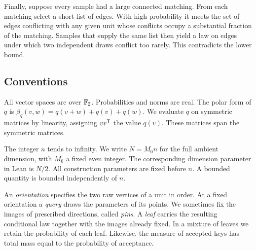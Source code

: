 Finally, suppose every sample had a large connected matching. From each
matching select a short list of edges. With high probability it meets the set of
edges conflicting with any given unit whose conflicts occupy a substantial
fraction of the matching. Samples that supply
the same list then yield a law on edges under which two independent
draws conflict too rarely. This contradicts the lower bound.

\subsection{Conventions}

All vector spaces are over \(\mathbb F_2\). Probabilities and norms are real.
The polar form of \(q\) is \(\beta_q(v,w)=q(v+w)+q(v)+q(w)\).
We evaluate \(q\) on symmetric matrices by linearity, assigning
\(vv^{\mathsf T}\) the value \(q(v)\). These matrices span the symmetric
matrices.

The integer \(n\) tends to infinity. We write \(N=M_0n\) for the full
ambient dimension, with \(M_0\) a fixed even integer. The corresponding
dimension parameter in Lean is \(N/2\). All construction parameters are
fixed before \(n\). A bounded quantity is bounded independently of \(n\).

An \emph{orientation} specifies the two raw vertices of a unit in order.
At a fixed orientation a \emph{query} draws the parameters of its points.
We sometimes fix the images of prescribed directions, called \emph{pins}.
A \emph{leaf} carries the resulting conditional law together with the
images already fixed. In a mixture of leaves we retain the probability
of each leaf. Likewise, the measure of accepted keys has total mass equal
to the probability of acceptance.
